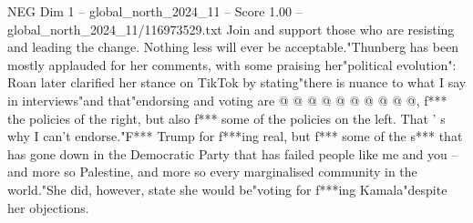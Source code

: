 \begin{textsample}{NEG Dim 1 – global\_north\_2024\_11 – Score 1.00 – global\_north\_2024\_11/116973529.txt}
Join and support those who are resisting and leading the change.
Nothing less will ever be acceptable."Thunberg has been mostly applauded for her comments, with some praising her"political evolution": Roan later clarified her stance on TikTok by stating"there is nuance to what I say in interviews"and that"endorsing and voting are @ @ @ @ @ @ @ @ @ @, f*** the policies of the right, but also f*** some of the policies on the left.
That ' s why I can't endorse."F*** Trump for f***ing real, but f*** some of the s*** that has gone down in the Democratic Party that has failed people like me and you -- and more so Palestine, and more so every marginalised community in the world."She did, however, state she would be"voting for f***ing Kamala"despite her objections.

\end{textsample}
